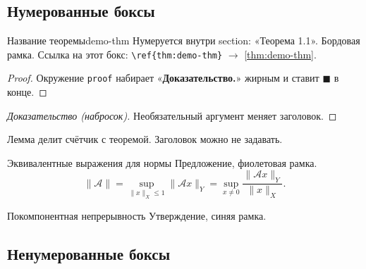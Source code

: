 %

\subsection{Нумерованные боксы}

\begin{Theorem}{Название теоремы}{demo-thm}
	Нумеруется внутри section: «Теорема 1.1». Бордовая рамка.
	Ссылка на этот бокс: \verb|\ref{thm:demo-thm}| $\to$ \ref{thm:demo-thm}.
\end{Theorem}

\begin{proof}
	Окружение \verb|proof| набирает «\textbf{Доказательство.}» жирным
	и ставит $\blacksquare$ в конце.
\end{proof}

\begin{proof}[Доказательство (набросок)]
	Необязательный аргумент меняет заголовок.
\end{proof}

\begin{Lemma}{}{}
	Лемма делит счётчик с теоремой. Заголовок можно не задавать.
\end{Lemma}

\begin{Proposition}{Эквивалентные выражения для нормы}{}
	Предложение, фиолетовая рамка.
	\[
	\|\mathcal{A}\| = \sup_{\|x\|_X \le 1} \|\mathcal{A}x\|_Y
	= \sup_{x \neq 0} \frac{\|\mathcal{A}x\|_Y}{\|x\|_X}.
	\]
\end{Proposition}

\begin{Statement}{Покомпонентная непрерывность}{}
	Утверждение, синяя рамка.
\end{Statement}

\subsection{Ненумерованные боксы}

